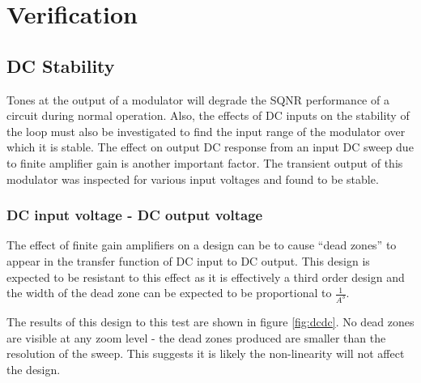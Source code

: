 \section{Verification}
\label{Verification}

    \subsection{DC Stability}
    \label{Verification:DCstab}
    Tones at the output of a modulator will degrade the SQNR performance of a circuit during normal operation.
    Also, the effects of DC inputs on the stability of the loop must also be investigated to find the input range of the modulator over which it is stable. 
    The effect on output DC response from an input DC sweep due to finite amplifier gain is another important factor.
    The transient output of this modulator was inspected for various input voltages and found to be stable.



        \subsubsection{DC input voltage - DC output voltage}
        \label{Verification:DCinputoutput}
        The effect of finite gain amplifiers on a design can be to cause ``dead zones'' to appear in the transfer function of DC input to DC output.
        This design is expected to be resistant to this effect as it is effectively a third order design and the width of the dead zone can be expected to be proportional to $\frac{1}{A^{3}}$.

        The results of this design to this test are shown in figure \ref{fig:dcdc}.
        No dead zones are visible at any zoom level - the dead zones produced are smaller than the resolution of the sweep.
        This suggests it is likely the non-linearity will not affect the design.

